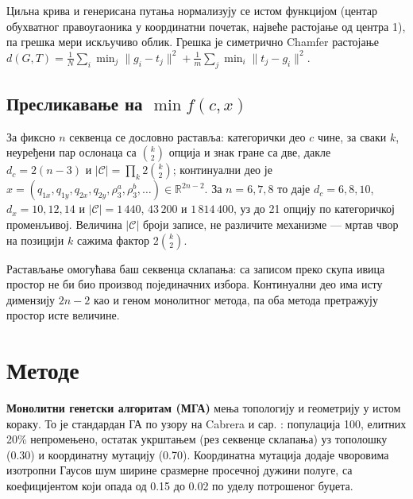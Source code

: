 \documentclass[
  conference,
  a4paper,
  10pt]{IEEEtran}
\begin{document}
Циљна крива и генерисана путања нормализују се истом функцијом (центар
обухватног правоугаоника у координатни почетак, највеће растојање од
центра 1), па грешка мери искључиво облик. Грешка је симетрично Chamfer
растојање
\(d(G,T) = \frac{1}{N}\sum_{i}\min_j \lVert g_i - t_j\rVert^2 + \frac{1}{m}\sum_{j}\min_i \lVert t_j - g_i\rVert^2\).

\hypertarget{ux43fux440ux435ux441ux43bux438ux43aux430ux432ux430ux45aux435-ux43dux430-min-fcx}{%
\subsection{\texorpdfstring{Пресликавање на
\(\min f(c,x)\)}{Пресликавање на \textbackslash min f(c,x)}}\label{ux43fux440ux435ux441ux43bux438ux43aux430ux432ux430ux45aux435-ux43dux430-min-fcx}}

За фиксно \(n\) секвенца се дословно раставља: категорички део \(c\)
чине, за сваки \(k\), неуређени пар ослонаца са \(\binom{k}{2}\) опција
и знак гране са две, дакле \(d_c = 2(n-3)\) и
\(|\mathcal{C}| = \prod_k 2\binom{k}{2}\); континуални део је
\(x = (q_{1x},q_{1y},q_{2x},q_{2y},\rho^a_3,\rho^b_3,\dots) \in \mathbb{R}^{2n-2}\).
За \(n = 6, 7, 8\) то даје \(d_c = 6, 8, 10\), \(d_x = 10, 12, 14\) и
\(|\mathcal{C}| = 1\,440\), \(43\,200\) и \(1\,814\,400\), уз до 21
опцију по категоричкој променљивој. Величина \(|\mathcal{C}|\) броји
записе, не различите механизме --- мртав чвор на позицији \(k\) сажима
фактор \(2\binom{k}{2}\).

Растављање омогућава баш секвенца склапања: са записом преко скупа ивица
простор не би био производ појединачних избора. Континуални део има исту
димензију \(2n-2\) као и геном монолитног метода, па оба метода
претражују простор исте величине.

\hypertarget{ux43cux435ux442ux43eux434ux435}{%
\section{Методе}\label{ux43cux435ux442ux43eux434ux435}}

\textbf{Монолитни генетски алгоритам (МГА)} мења топологију и геометрију
у истом кораку. То је стандардан ГА по узору на Cabrera и сар.
\citep{cabrera}: популација 100, елитних 20\% непромењено, остатак
укрштањем (рез секвенце склапања) уз тополошку (0.30) и координатну
мутацију (0.70). Координатна мутација додаје чворовима изотропни Гаусов
шум ширине сразмерне просечној дужини полуге, са коефицијентом који
опада од 0.15 до 0.02 по уделу потрошеног буџета.
\end{document}
